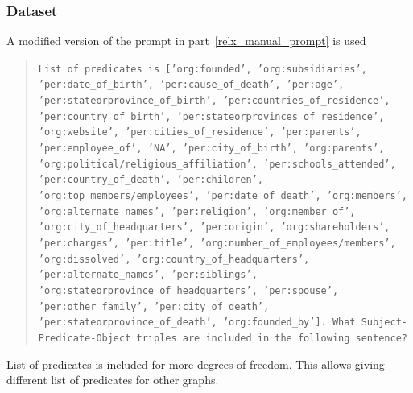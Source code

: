 \documentclass{article}
\begin{document}
\subsubsection{Dataset}
A modified version of the prompt in part~\ref{relx_manual_prompt} is used
\begin{quote}
    \texttt{List of predicates is ['org:founded', 'org:subsidiaries', 'per:date\_of\_birth', 'per:cause\_of\_death', 'per:age', 'per:stateorprovince\_of\_birth', 'per:countries\_of\_residence', 'per:country\_of\_birth', 'per:stateorprovinces\_of\_residence', 'org:website', 'per:cities\_of\_residence', 'per:parents', 'per:employee\_of', 'NA', 'per:city\_of\_birth', 'org:parents', 'org:political/religious\_affiliation', 'per:schools\_attended', 'per:country\_of\_death', 'per:children', 'org:top\_members/employees', 'per:date\_of\_death', 'org:members', 'org:alternate\_names', 'per:religion', 'org:member\_of', 'org:city\_of\_headquarters', 'per:origin', 'org:shareholders', 'per:charges', 'per:title', 'org:number\_of\_employees/members', 'org:dissolved', 'org:country\_of\_headquarters', 'per:alternate\_names', 'per:siblings', 'org:stateorprovince\_of\_headquarters', 'per:spouse', 'per:other\_family', 'per:city\_of\_death', 'per:stateorprovince\_of\_death', 'org:founded\_by']. What Subject-Predicate-Object triples are included in the following sentence?}
\end{quote}
List of predicates is included for more degrees of freedom. This allows giving different list of predicates for other graphs. 
\end{document}
